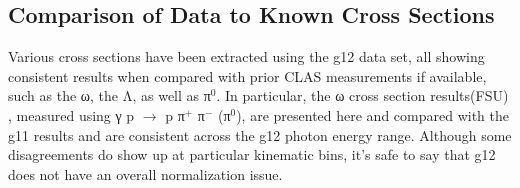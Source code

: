 %
%
%
%
%
%




\subsection{\label{sec:xsec}Comparison of Data to Known Cross Sections}

Various cross sections have been extracted using the g12 data set, all showing consistent results when compared with prior CLAS measurements if available, such as the ω, the Λ, as well as π$^0$. In particular, the ω cross section results(FSU) , measured using γ p $\rightarrow$ p π$^+$ π$^-$ (π$^0$), are presented here and compared with the g11 results and are consistent across the g12 photon energy range. Although some disagreements do show up at particular kinematic bins, it's safe to say that g12 does not have an overall normalization issue.

